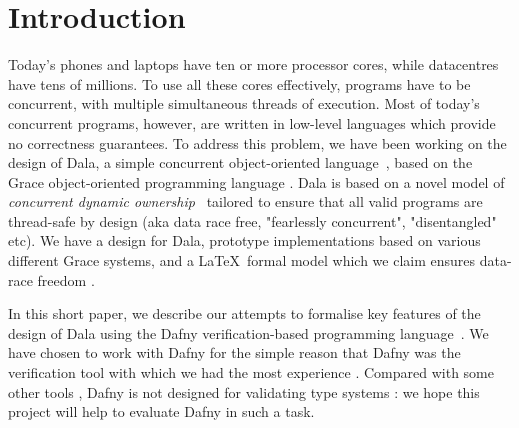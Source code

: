 \section{Introduction}

Today’s phones and laptops have ten or more processor cores, while datacentres have tens of millions. To use all these cores effectively, programs  have to be concurrent,  with multiple simultaneous threads of execution. Most of today’s concurrent programs, however, are written in low-level languages which provide no correctness guarantees. 
To address this problem, we have been working on the design of Dala, a simple concurrent object-oriented language~\cite{Dalarna,dala-onward2021}, based on the Grace object-oriented programming language \cite{grace-onward2012}.
Dala is based on a novel model of \textit{concurrent dynamic  ownership}~\cite{dynamicOwn,dynamicAlias} tailored to 
ensure that all valid programs are thread-safe  by design (aka data race free, "fearlessly concurrent", "disentangled" etc).  
We have a design for Dala, prototype implementations based on various different Grace systems, 
and a \LaTeX\ formal model which we claim ensures data-race freedom \cite{kiko-phd,dala-onward2021}. 


 
In this short paper, we describe our attempts to formalise key features of the design of Dala using the Dafny verification-based programming language~\cite{dafnytsite,Leino2013,dafny2023}.  We have chosen to work with Dafny for the simple reason that Dafny was the verification tool with which we had the most experience \cite{MPTP,learn2024,flags2024}. Compared with some other tools \cite{coq,CompCert,DBLP:journals/cacm/Leroy09}, Dafny is not designed for validating type systems
\cite{types-dafnyblog2024,typesystems-dafny2024,stability-dafny2024}:
we hope this project will help to evaluate Dafny in such a task.

